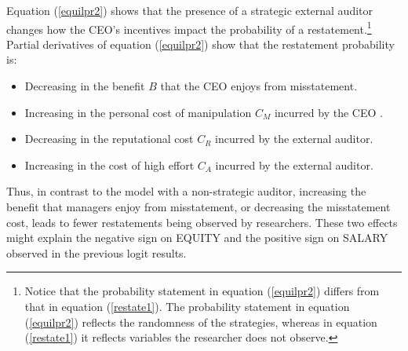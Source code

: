 \documentclass[12pt,reqno,titlepage]{amsart}
\theoremstyle{definition}
\begin{document}
\begin{doublespace}
Equation (\ref{equilpr2}) shows that the presence of a strategic external auditor
changes how the CEO's incentives impact the probability of a restatement.\footnote{Notice that
the probability statement in equation  (\ref{equilpr2})  differs from that in equation (\ref{restate1}).
The probability statement in equation  (\ref{equilpr2}) reflects the randomness of the strategies, whereas in equation (\ref{restate1}) it reflects variables the researcher does not observe.} 
Partial derivatives of equation (\ref{equilpr2}) show that the restatement probability is:
\begin{itemize}
\item Decreasing in the benefit $B$ that the CEO enjoys from misstatement.
\item Increasing in the personal cost of manipulation $C_M$ incurred by the CEO .
\item Decreasing in the reputational cost $C_R$ incurred by the external auditor.
\item Increasing in the cost of high effort $C_A$ incurred by the external auditor.
\end{itemize}

Thus, in contrast to the model with a non-strategic auditor, increasing the benefit that managers enjoy from misstatement, or decreasing the misstatement cost, leads to fewer restatements being observed by researchers.
These two effects might explain the negative sign on EQUITY and the positive sign on SALARY observed in the previous logit results. 


\end{doublespace}
\end{document}
